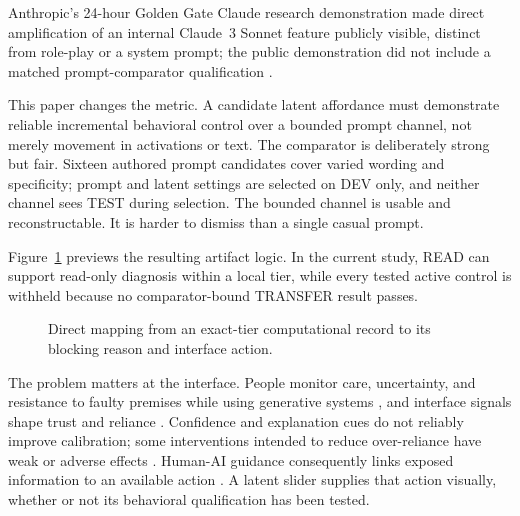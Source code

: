 \documentclass[sigconf]{acmart}
\begin{document}
Anthropic's 24-hour Golden Gate Claude research demonstration made direct amplification of an internal Claude~3 Sonnet feature publicly visible, distinct from role-play or a system prompt; the public demonstration did not include a matched prompt-comparator qualification \cite{anthropic2024goldengate}.

This paper changes the metric. A candidate latent affordance must demonstrate reliable incremental behavioral control over a bounded prompt channel, not merely movement in activations or text. The comparator is deliberately strong but fair. Sixteen authored prompt candidates cover varied wording and specificity; prompt and latent settings are selected on DEV only, and neither channel sees TEST during selection. The bounded channel is usable and reconstructable. It is harder to dismiss than a single casual prompt.

Figure~\ref{fig:concept} previews the resulting artifact logic. In the current study, READ can support read-only diagnosis within a local tier, while every tested active control is withheld because no comparator-bound TRANSFER result passes.

\begin{figure}[t]
  \centering
  
  \caption{Direct mapping from an exact-tier computational record to its blocking reason and interface action.}
  \label{fig:concept}
\end{figure}

The problem matters at the interface. People monitor care, uncertainty, and resistance to faulty premises while using generative systems \cite{tankelevitch2024metacog}, and interface signals shape trust and reliance \cite{lee2004trust}. Confidence and explanation cues do not reliably improve calibration; some interventions intended to reduce over-reliance have weak or adverse effects \cite{bansal2019beyond,bucinca2021trust}. Human-AI guidance consequently links exposed information to an available action \cite{amershi2019guidelines,liao2024transparency}. A latent slider supplies that action visually, whether or not its behavioral qualification has been tested.
\end{document}
